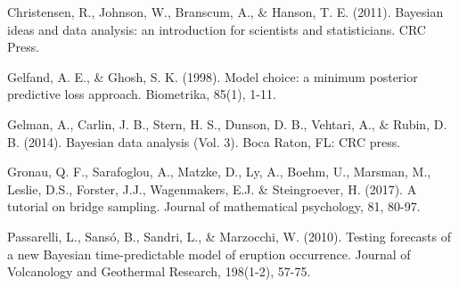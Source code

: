 \documentclass{asaproc}
\begin{document}
\begin{references}
{\footnotesize
\itemsep=3pt

\item Christensen, R., Johnson, W., Branscum, A., \& Hanson, T. E. (2011). Bayesian ideas and data analysis: an introduction for scientists and statisticians. CRC Press. 

\item Gelfand, A. E., \& Ghosh, S. K. (1998). Model choice: a minimum posterior predictive loss approach. Biometrika, 85(1), 1-11.

\item Gelman, A., Carlin, J. B., Stern, H. S., Dunson, D. B., Vehtari, A., \& Rubin, D. B. (2014). Bayesian data analysis (Vol. 3). Boca Raton, FL: CRC press.

\item Gronau, Q. F., Sarafoglou, A., Matzke, D., Ly, A., Boehm, U., Marsman, M.,  Leslie, D.S., Forster, J.J., Wagenmakers, E.J. \& Steingroever, H. (2017). A tutorial on bridge sampling. Journal of mathematical psychology, 81, 80-97.

\item Passarelli, L., Sansó, B., Sandri, L., \& Marzocchi, W. (2010). Testing forecasts of a new Bayesian time-predictable model of eruption occurrence. Journal of Volcanology and Geothermal Research, 198(1-2), 57-75.
}

\end{references}
\end{document}
